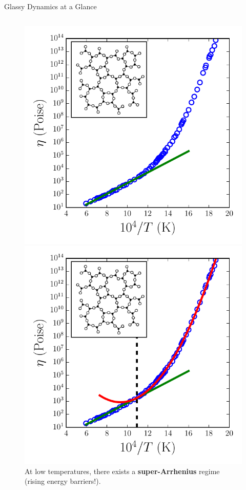 \begin{frame}{Glassy Dynamics at a Glance}
\begin{columns}
\begin{column}{0.5\linewidth}
\begin{figure}
\begin{overprint}
    
    \centering\includegraphics[height=0.675\textheight]{intro_glassy/timerelax_b2o3_2.pdf}
    \caption{At high temperatures, there exists an Arrhenius regime (a single activation energy $E_a$).}
    
    
    \centering\includegraphics[height=0.675\textheight]{intro_glassy/timerelax_b2o3_4.pdf}
    \caption{At low temperatures, there exists a \textbf{super-Arrhenius} regime (rising energy barriers!).}
    

\end{overprint}
\end{figure}
\end{column}
\end{columns}
\end{frame}
